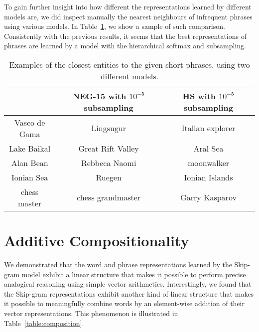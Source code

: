 \documentclass{article}
\begin{document}
To gain further insight into how different the representations learned by different
models are, we did inspect manually the nearest neighbours of infrequent phrases
using various models. In Table~\ref{table:comparison}, we show a sample of such comparison.
Consistently with the previous results, it seems that the best representations of
phrases are learned by a model with the hierarchical softmax and subsampling.
\begin{table}
\small
\begin{center}
\begin{tabular}{|c|c|c|}
\hline
                  & NEG-15 with $10^{-5}$ subsampling  &         HS with $10^{-5}$ subsampling \\
\hline
 Vasco de Gama    &   Lingsugur              &            Italian explorer \\
Lake Baikal       &   Great Rift Valley      &            Aral Sea \\
 Alan Bean        &   Rebbeca Naomi          &            moonwalker \\
Ionian Sea        &   Ruegen                 &            Ionian Islands \\
chess master      &   chess grandmaster      &            Garry Kasparov   \\
\hline
\end{tabular}
\end{center}
\caption{\label{table:comparison} Examples of the closest entities to the given short phrases, using two different models.}
\end{table}

\section{Additive Compositionality}

We demonstrated that the word and phrase representations learned by the Skip-gram
model exhibit a linear structure that makes it possible to perform
precise analogical reasoning using simple vector arithmetics.
Interestingly, we found that the Skip-gram representations exhibit
another kind of linear structure that makes it possible to meaningfully combine
words by an element-wise addition of their vector representations.
This phenomenon is illustrated in Table~\ref{table:composition}.
\end{document}
